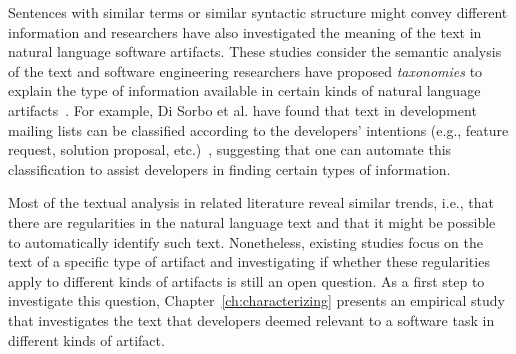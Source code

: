 Sentences with similar terms or similar syntactic structure might convey different information
and researchers have also investigated the meaning of the text in natural language software artifacts. 
These studies consider the semantic analysis of the text and 
software engineering researchers have proposed \textit{taxonomies} to explain the type of information 
available in certain kinds of natural language artifacts~\cite{Maalej2013, Arya2019}. 
For example, Di Sorbo et al. have found that 
text in development mailing lists can be classified according to the developers' intentions (e.g., feature request, solution proposal, etc.)~\cite{Sorbo2015},
suggesting that one can automate this classification to assist developers in finding 
certain types of information.




Most of the textual analysis in related literature reveal similar trends, i.e., 
that there are regularities in the natural language text and that it might be possible 
to automatically identify such text. Nonetheless, 
existing studies focus on the text of a specific 
type of artifact and investigating if whether these regularities 
apply to different kinds of artifacts is still an open question. 
As a first step to investigate this question, 
Chapter~\ref{ch:characterizing}
presents an empirical study that investigates 
the text that developers 
deemed relevant to a software task 
in different kinds of artifact.




















